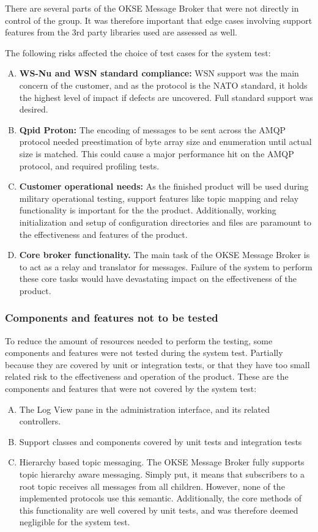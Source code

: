 There are several parts of the OKSE Message Broker that were not directly in control of the group. It was therefore important that edge cases involving support features from the 3rd party libraries used are assessed as well.

The following risks affected the choice of test cases for the system test:

\begin{enumerate}[A.]
\item \textbf{WS-Nu and WSN standard compliance:} WSN support was the main concern of the customer, and as the protocol is the NATO standard, it holds the highest level of impact if defects are uncovered. Full standard support was desired.
\item \textbf{Qpid Proton:} The encoding of messages to be sent across the AMQP protocol needed preestimation of byte array size and enumeration until actual size is matched. This could cause a major performance hit on the AMQP protocol, and required profiling tests.
\item \textbf{Customer operational needs:} As the finished product will be used during military operational testing, support features like topic mapping and relay functionality is important for the the product. Additionally, working initialization and setup of configuration directories and files are paramount to the effectiveness and features of the product.
\item \textbf{Core broker functionality.} The main task of the OKSE Message Broker is to act as a relay and translator for messages. Failure of the system to perform these core tasks would have devastating impact on the effectiveness of the product.
\end{enumerate}

\subsubsection{Components and features not to be tested}

To reduce the amount of resources needed to perform the testing, some components and features were not tested during the system test. Partially because they are covered by unit or integration tests, or that they have too small related risk to the effectiveness and operation of the product.
These are the components and features that were not covered by the system test:

\begin{enumerate}[A.]
\item The Log View pane in the administration interface, and its related controllers.
\item Support classes and components covered by unit tests and integration tests
\item Hierarchy based topic messaging. The OKSE Message Broker fully supports topic hierarchy aware messaging. Simply put, it means that subscribers to a root topic receives all messages from all children. However, none of the implemented protocols use this semantic. Additionally, the core methods of this functionality are well covered by unit tests, and was therefore deemed negligible for the system test.
\end{enumerate}

